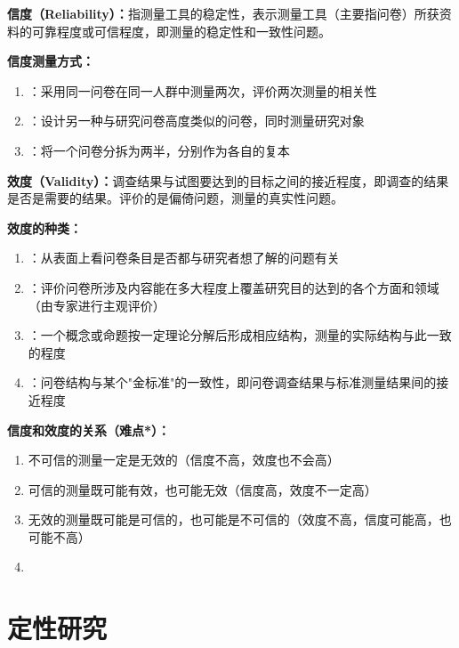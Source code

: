 \begin{keybox}
\textbf{信度（Reliability）：}指测量工具的稳定性，表示测量工具（主要指问卷）所获资料的可靠程度或可信程度，即测量的稳定性和一致性问题。

\textbf{信度测量方式：}
\begin{enumerate}[leftmargin=*]
    \item {}：采用同一问卷在同一人群中测量两次，评价两次测量的相关性
    \item {}：设计另一种与研究问卷高度类似的问卷，同时测量研究对象
    \item {}：将一个问卷分拆为两半，分别作为各自的复本
\end{enumerate}

\textbf{效度（Validity）：}调查结果与试图要达到的目标之间的接近程度，即调查的结果是否是需要的结果。评价的是偏倚问题，测量的真实性问题。

\textbf{效度的种类：}
\begin{enumerate}[leftmargin=*]
    \item {}：从表面上看问卷条目是否都与研究者想了解的问题有关
    \item {}：评价问卷所涉及内容能在多大程度上覆盖研究目的达到的各个方面和领域（由专家进行主观评价）
    \item {}：一个概念或命题按一定理论分解后形成相应结构，测量的实际结构与此一致的程度
    \item {}：问卷结构与某个"金标准"的一致性，即问卷调查结果与标准测量结果间的接近程度
\end{enumerate}

\textbf{信度和效度的关系（难点*）：}
\begin{enumerate}[leftmargin=*]
    \item 不可信的测量一定是无效的（信度不高，效度也不会高）
    \item 可信的测量既可能有效，也可能无效（信度高，效度不一定高）
    \item 无效的测量既可能是可信的，也可能是不可信的（效度不高，信度可能高，也可能不高）
    \item {}
\end{enumerate}
\end{keybox}

\section{定性研究}

